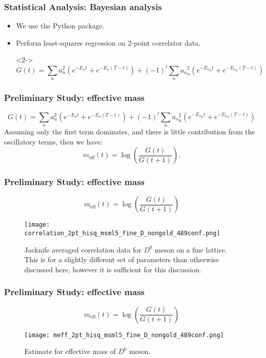 \documentclass{beamer}
\begin{document}
\begin{frame}
    \frametitle{Statistical Analysis: Bayesian analysis}
    \begin{itemize}
        \item<1-> We use the \cite{lepage2020corrfitter} Python package.
        \item<2-> Perform least-squares regression on 2-point correlator data.
        \item[]<2-> 
            \begin{equation*}
                G(t) = \sum_n a_n^2 (e^{-E_n t} + e^{-E_n(T-t)}) + {(-1)}^t \sum_n {a_o}_n^2 (e^{-{E_o}_n t} + e^{{-E_o}_n (T-t)})
            \end{equation*}
\end{itemize}
\end{frame}

\begin{frame}
    \frametitle{Preliminary Study: effective mass}
    \begin{equation*}
        G(t) = \sum_n a_n^2 (e^{-E_n t} + e^{-E_n(T-t)}) + {(-1)}^t \sum_n {a_o}_n^2 (e^{-{E_o}_n t} + e^{{-E_o}_n (T-t)})
    \end{equation*}
    Assuming only the first term dominates, and there is little contribution from the oscillatory terms, then we have:
    \begin{equation*}
        m_{\mathrm{eff}}(t) = \log(\frac{G(t)}{G(t+1)}).
    \end{equation*}
\end{frame}

\begin{frame}
    \frametitle{Preliminary Study: effective mass}
    \begin{equation*}
        m_{\mathrm{eff}}(t) = \log(\frac{G(t)}{G(t+1)})
    \end{equation*}
    \begin{figure}
        \centering
        \texttt{[image: correlation\_2pt\_hisq\_msml5\_fine\_D\_nongold\_489conf.png]}
        \caption{Jacknife averaged correlation data for $D^0$ meson on a fine lattice. This is for a slightly different set of parameters than otherwise discussed here, however it is sufficient for this discussion.}
    \end{figure}
\end{frame}

\begin{frame}
    \frametitle{Preliminary Study: effective mass}
    \begin{equation*}
        m_{\mathrm{eff}}(t) = \log(\frac{G(t)}{G(t+1)})
    \end{equation*}
    \begin{figure}
        \centering
        \texttt{[image: meff\_2pt\_hisq\_msml5\_fine\_D\_nongold\_489conf.png]}
        \caption{Estimate for effective mass of $D^0$ meson.}
    \end{figure}
\end{frame}
\end{document}
